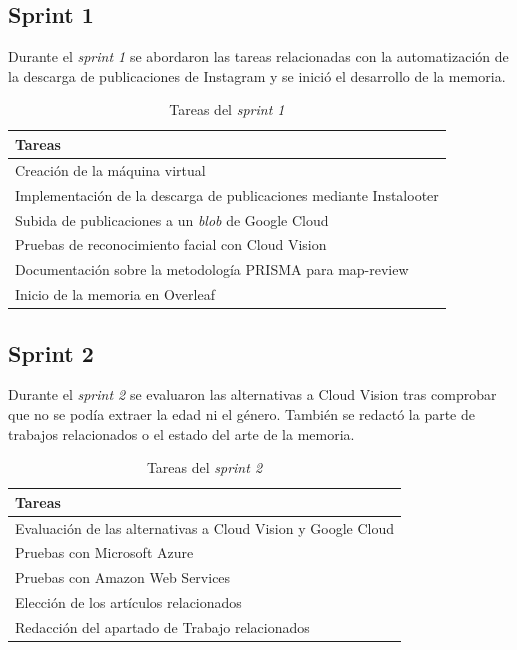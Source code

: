 \subsection{Sprint 1}
Durante el \textit{sprint 1} se abordaron las tareas relacionadas con la automatización de la descarga de publicaciones de Instagram y se inició el desarrollo de la memoria.

\begin{table}[H]
    \centering
    \begin{tabular}{l}
    \hline
    \textbf{Tareas} \\ \hline
    Creación de la máquina virtual \\
    Implementación de la descarga de publicaciones mediante Instalooter \\
    Subida de publicaciones a un \textit{blob} de Google Cloud \\
    Pruebas de reconocimiento facial con Cloud Vision \\
    Documentación sobre la metodología PRISMA para map-review \\
    Inicio de la memoria en Overleaf \\ \hline
    \end{tabular}
    \caption{Tareas del \textit{sprint 1}}
    \label{tab:tasks_sprint1}
\end{table}

\subsection{Sprint 2}
Durante el \textit{sprint 2} se evaluaron las alternativas a Cloud Vision tras comprobar que no se podía extraer la edad ni el género. También se redactó la parte de trabajos relacionados o el estado del arte de la memoria.

\begin{table}[H]
    \centering
    \begin{tabular}{l}
    \hline
    \textbf{Tareas} \\ \hline
    Evaluación de las alternativas a Cloud Vision y Google Cloud \\
    Pruebas con Microsoft Azure \\
    Pruebas con Amazon Web Services \\
    Elección de los artículos relacionados \\
    Redacción del apartado de Trabajo relacionados \\ \hline
    \end{tabular}
    \caption{Tareas del \textit{sprint 2}}
    \label{tab:tasks_sprint2}
\end{table}

